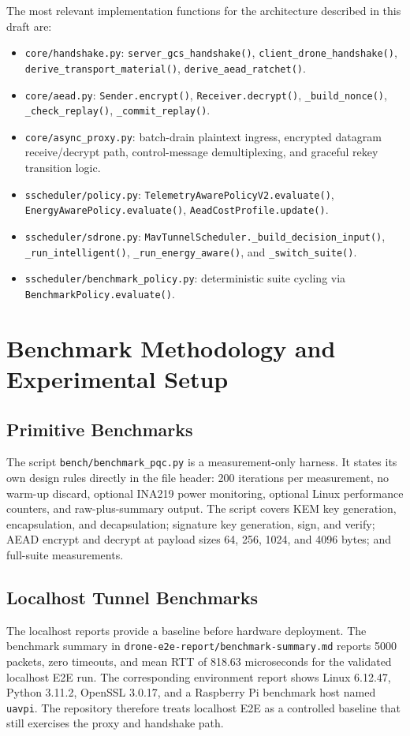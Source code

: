 \documentclass[11pt]{article}
\begin{document}
The most relevant implementation functions for the architecture described in this draft are:
\begin{itemize}[leftmargin=*]
\item \texttt{core/handshake.py}: \texttt{server\_gcs\_handshake()}, \texttt{client\_drone\_handshake()}, \texttt{derive\_transport\_material()}, \texttt{derive\_aead\_ratchet()}.
\item \texttt{core/aead.py}: \texttt{Sender.encrypt()}, \texttt{Receiver.decrypt()}, \texttt{\_build\_nonce()}, \texttt{\_check\_replay()}, \texttt{\_commit\_replay()}.
\item \texttt{core/async\_proxy.py}: batch-drain plaintext ingress, encrypted datagram receive/decrypt path, control-message demultiplexing, and graceful rekey transition logic.
\item \texttt{sscheduler/policy.py}: \texttt{TelemetryAwarePolicyV2.evaluate()}, \texttt{EnergyAwarePolicy.evaluate()}, \texttt{AeadCostProfile.update()}.
\item \texttt{sscheduler/sdrone.py}: \texttt{MavTunnelScheduler.\_build\_decision\_input()}, \texttt{\_run\_intelligent()}, \texttt{\_run\_energy\_aware()}, and \texttt{\_switch\_suite()}.
\item \texttt{sscheduler/benchmark\_policy.py}: deterministic suite cycling via \texttt{BenchmarkPolicy.evaluate()}.
\end{itemize}

\section{Benchmark Methodology and Experimental Setup}
\subsection{Primitive Benchmarks}
The script \texttt{bench/benchmark\_pqc.py} is a measurement-only harness. It states its own design rules directly in the file header: 200 iterations per measurement, no warm-up discard, optional INA219 power monitoring, optional Linux performance counters, and raw-plus-summary output. The script covers KEM key generation, encapsulation, and decapsulation; signature key generation, sign, and verify; AEAD encrypt and decrypt at payload sizes 64, 256, 1024, and 4096 bytes; and full-suite measurements.

\subsection{Localhost Tunnel Benchmarks}
The localhost reports provide a baseline before hardware deployment. The benchmark summary in \texttt{drone-e2e-report/benchmark-summary.md} reports 5000 packets, zero timeouts, and mean RTT of 818.63 microseconds for the validated localhost E2E run. The corresponding environment report shows Linux 6.12.47, Python 3.11.2, OpenSSL 3.0.17, and a Raspberry Pi benchmark host named \texttt{uavpi}. The repository therefore treats localhost E2E as a controlled baseline that still exercises the proxy and handshake path.
\end{document}
